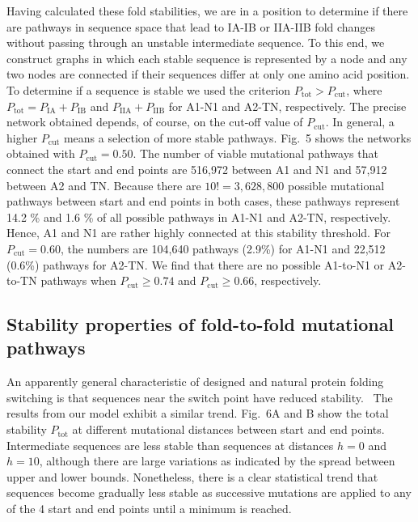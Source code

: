 \documentclass[%
 aip,
rsi,%
 amsmath,amssymb,
 reprint,%
]{revtex4-1}
\newcommand {\Pcut}     	{{P_\mathrm{cut}}}
\newcommand {\Ptot}	{{P_\mathrm{tot}}}
\newcommand {\PIA}    	{{P_\mathrm{IA}}}
\newcommand {\PIB}    	{{P_\mathrm{IB}}}
\newcommand {\PIIA}    	{{P_\mathrm{IIA}}}
\newcommand {\PIIB}    	{{P_\mathrm{IIB}}}
\begin{document}
Having calculated these fold stabilities, we are in a position to determine if there are pathways in sequence space that lead to IA-IB or IIA-IIB fold changes without passing through an unstable intermediate sequence. To this end, we construct graphs in which each stable sequence is represented by a node and any two nodes are connected if their sequences differ at only one amino acid position. To determine if a sequence is stable we used the criterion $P_\mathrm{tot}>\Pcut$, where  $\Ptot = \PIA + \PIB$ and $\PIIA + \PIIB$ for A1-N1 and A2-TN, respectively. The precise network obtained depends, of course, on the cut-off value of $\Pcut$. In general, a higher $\Pcut$ means a selection of more stable pathways. Fig.~5 shows the networks obtained with $\Pcut=0.50$. The number of viable mutational pathways that connect the start and end points are 516,972 between A1 and N1 and  57,912 between A2 and TN. Because there are $10! =3,628,800$ possible mutational pathways between start and end points in both cases, these pathways represent 14.2 \% and 1.6 \% of all possible pathways in A1-N1 and A2-TN, respectively. Hence, A1 and N1 are rather highly connected at this stability threshold. For $\Pcut=0.60$, the numbers are 104,640 pathways (2.9\%) for A1-N1 and 22,512 (0.6\%) pathways for A2-TN. We find that there are no possible A1-to-N1 or A2-to-TN pathways when $\Pcut\ge0.74$ and $\Pcut\ge 0.66$, respectively. \\

\subsection{Stability properties of fold-to-fold mutational pathways}
\noindent 
An apparently general characteristic of designed and natural protein folding switching is that sequences near the switch point have reduced stability.~\cite{Bryan2010} The results from our model exhibit a similar trend. Fig.~6A and B show the total stability $\Ptot$ at different mutational distances between start and end points. Intermediate sequences are less stable than sequences at distances $h=0$ and $h=10$, although there are large variations as indicated by the spread between upper and lower bounds. Nonetheless, there is a clear statistical trend that sequences become gradually less stable as successive mutations are applied to any of the 4 start and end points until a minimum is reached. 
\end{document}
